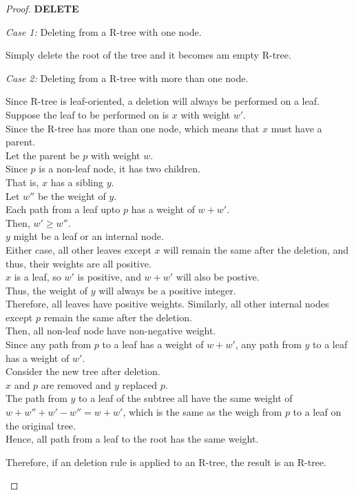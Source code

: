\documentclass[10pt]{article}
\begin{document}
\begin{enumerate}
\begin{proof}
	\textbf{DELETE}
	\begin{addmargin}[1em]{0em}
		\textit{Case 1:} Deleting from a R-tree with one node.
		\begin{addmargin}[1em]{0em}
			Simply delete the root of the tree and it becomes am empty R-tree.
		\end{addmargin}
		\textit{Case 2:} Deleting from a R-tree with more than one node.
		\begin{addmargin}[1em]{0em}
			Since R-tree is leaf-oriented, a deletion will always be performed on a leaf. \\
			Suppose the leaf to be performed on is $x$ with weight $w'$. \\
			Since the R-tree has more than one node, which means that $x$ must have a parent. \\
			Let the parent be $p$ with weight $w$. \\
			Since $p$ is a non-leaf node, it has two children. \\
			That is, $x$ has a sibling $y$. \\
			Let $w''$ be the weight of $y$. \\
			Each path from a leaf upto $p$ has a weight of $w+w'$. \\
			Then, $w' \geq w''$. \\
			$y$ might be a leaf or an internal node. \\
			Either case, all other leaves except $x$ will remain the same after the deletion, and thus, their weights are all positive. \\
			$x$ is a leaf, so $w'$ is positive, and $w+w'$ will also be postive. \\
			Thus, the weight of $y$ will always be a positive integer. \\
			Therefore, all leaves have positive weights.
			Similarly, all other internal nodes except $p$ remain the same after the deletion. \\
			Then, all non-leaf node have non-negative weight.\\
			Since any path from $p$ to a leaf has a weight of $w+w'$, any path from $y$ to a leaf has a weight of $w'$. \\
			Consider the new tree after deletion. \\
			$x$ and $p$ are removed and $y$ replaced $p$. \\
			The path from $y$ to a leaf of the subtree all have the same weight of $w+w''+w'-w'' = w+w'$, which is the same as the weigh from $p$ to a leaf on the original tree. \\
			Hence, all path from a leaf to the root has the same weight.
		\end{addmargin}
		Therefore, if an deletion rule is applied to an R-tree, the result is an R-tree.	
	\end{addmargin}


\end{proof}
\end{enumerate}
\end{document}
